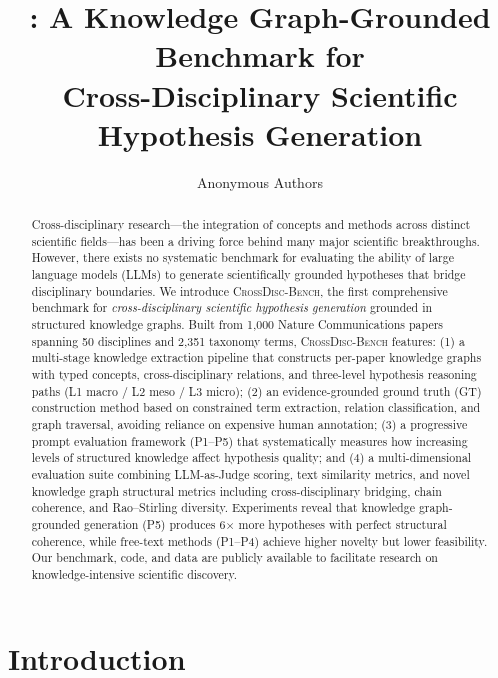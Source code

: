 \documentclass{article}
\title{\ours{}: A Knowledge Graph-Grounded Benchmark for \\
Cross-Disciplinary Scientific Hypothesis Generation}
\author{
  Anonymous Authors \\
}
\newcommand{\ours}{\textsc{CrossDisc-Bench}}
\begin{document}
\maketitle

\begin{abstract}
Cross-disciplinary research---the integration of concepts and methods across distinct scientific fields---has been a driving force behind many major scientific breakthroughs.
However, there exists no systematic benchmark for evaluating the ability of large language models (LLMs) to generate scientifically grounded hypotheses that bridge disciplinary boundaries.
We introduce \ours{}, the first comprehensive benchmark for \emph{cross-disciplinary scientific hypothesis generation} grounded in structured knowledge graphs.
Built from 1{,}000 Nature Communications papers spanning 50 disciplines and 2{,}351 taxonomy terms, \ours{} features:
(1) a multi-stage knowledge extraction pipeline that constructs per-paper knowledge graphs with typed concepts, cross-disciplinary relations, and three-level hypothesis reasoning paths (L1 macro / L2 meso / L3 micro);
(2) an evidence-grounded ground truth (GT) construction method based on constrained term extraction, relation classification, and graph traversal, avoiding reliance on expensive human annotation;
(3) a progressive prompt evaluation framework (P1--P5) that systematically measures how increasing levels of structured knowledge affect hypothesis quality; and
(4) a multi-dimensional evaluation suite combining LLM-as-Judge scoring, text similarity metrics, and novel knowledge graph structural metrics including cross-disciplinary bridging, chain coherence, and Rao--Stirling diversity.
Experiments reveal that knowledge graph-grounded generation (P5) produces 6$\times$ more hypotheses with perfect structural coherence, while free-text methods (P1--P4) achieve higher novelty but lower feasibility.
Our benchmark, code, and data are publicly available to facilitate research on knowledge-intensive scientific discovery.
\end{abstract}

\section{Introduction}
\label{sec:intro}
\end{document}
